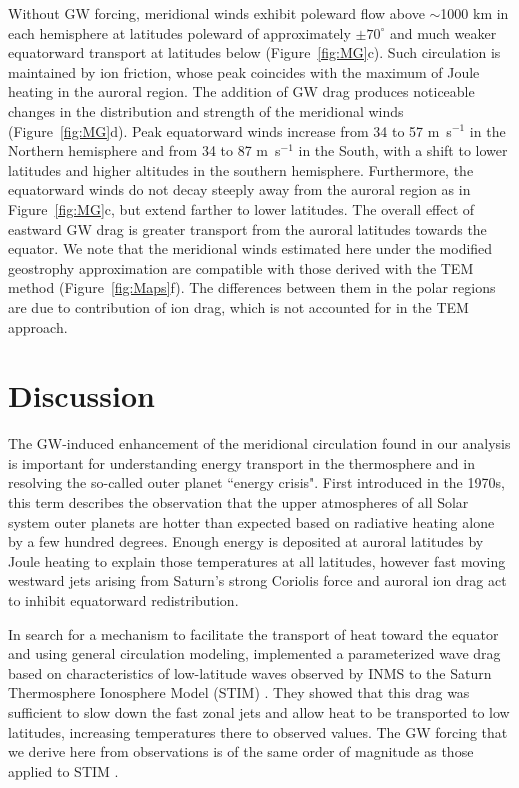 Without GW forcing, meridional winds exhibit poleward flow above $\sim$1000 km in each hemisphere at latitudes poleward of approximately $\pm70^\circ$ and much weaker equatorward transport at latitudes below (Figure~\ref{fig:MG}c). Such circulation is maintained by ion friction, whose peak coincides with the maximum of Joule heating in the auroral region. The addition of GW drag produces noticeable changes in the distribution and strength of the meridional winds (Figure~\ref{fig:MG}d). Peak equatorward winds increase from 34 to 57 m~s$^{-1}$ in the Northern hemisphere and from 34 to 87 m~s$^{-1}$ in the South, with a shift to lower latitudes and higher altitudes in the southern hemisphere. Furthermore, the equatorward winds do not decay steeply away from the auroral region as in Figure~\ref{fig:MG}c, but extend farther to lower latitudes. The overall effect of eastward GW drag is greater transport from the auroral latitudes towards the equator. We note that the meridional winds estimated here under the modified geostrophy approximation are compatible with those derived with the TEM method (Figure~\ref{fig:Maps}f). The differences between them in the polar regions are due to contribution of ion drag, which is not accounted for in the TEM approach.

\section{Discussion}
\label{sec:diss}
The GW-induced enhancement of the meridional circulation found in our analysis is important for understanding energy transport in the thermosphere and in resolving the so-called outer planet ``energy crisis". First introduced in the 1970s, this term describes the observation that the upper atmospheres of all Solar system outer planets are hotter than expected based on radiative heating alone by a few hundred degrees. Enough energy is deposited at auroral latitudes by Joule heating to explain those temperatures at all latitudes, however fast moving westward jets arising from Saturn’s strong Coriolis force and auroral ion drag act to inhibit equatorward redistribution.

In search for a mechanism to facilitate the transport of heat toward the equator and using general circulation modeling,  implemented a parameterized wave drag based on characteristics of low-latitude waves observed by INMS to the Saturn Thermosphere Ionosphere Model (STIM) \cite{MW12}. They showed that this drag was sufficient to slow down the fast zonal jets and allow heat to be transported to low latitudes, increasing temperatures there to observed values. The GW forcing that we derive here from observations is of the same order of magnitude as those applied to STIM  \cite<see Figure 3 of>{Brown20}.

